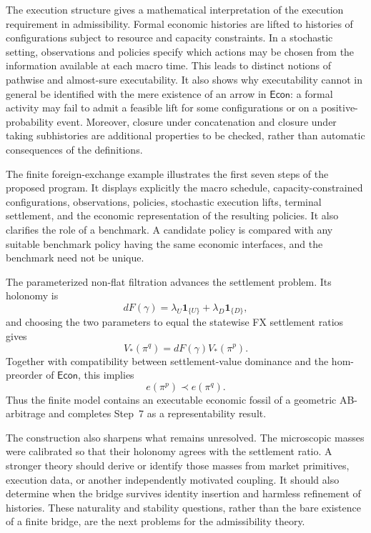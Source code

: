 \documentclass[11pt,a4paper]{article}
\newcommand{\Econ}{\mathsf{Econ}}
\begin{document}
The execution structure gives a mathematical interpretation of the
execution requirement in admissibility.  Formal economic histories are
lifted to histories of configurations subject to resource and capacity
constraints.  In a stochastic setting, observations and policies specify
which actions may be chosen from the information available at each macro
time.  This leads to distinct notions of pathwise and almost-sure
executability.  It also shows why executability cannot in general be
identified with the mere existence of an arrow in \(\Econ\): a formal
activity may fail to admit a feasible lift for some configurations or on
a positive-probability event.  Moreover, closure under concatenation and
closure under taking subhistories are additional properties to be checked,
rather than automatic consequences of the definitions.

The finite foreign-exchange example illustrates the first seven steps of
the proposed program.  It displays explicitly the macro schedule,
capacity-constrained configurations, observations, policies, stochastic
execution lifts, terminal settlement, and the economic representation of
the resulting policies.  It also clarifies the role of a benchmark.  
A candidate policy is compared with any suitable benchmark policy having
the same economic interfaces, and the benchmark need not be unique.

The parameterized non-flat filtration advances the settlement problem.
Its holonomy is
\[
  dF(\gamma)
  =\lambda_U\mathbf1_{\{U\}}
   +\lambda_D\mathbf1_{\{D\}},
\]
and choosing the two parameters to equal the statewise FX settlement ratios
gives
\[
  V_*(\pi^q)=dF(\gamma)V_*(\pi^p).
\]
Together with compatibility between settlement-value dominance and the
hom-preorder of \(\Econ\), this implies
\[
  e(\pi^p)\prec e(\pi^q).
\]
Thus the finite model contains an executable economic fossil of a geometric
AB-arbitrage and completes Step~7 as a representability result.

The construction also sharpens what remains unresolved.  The microscopic
masses were calibrated so that their holonomy agrees with the settlement
ratio.  A stronger theory should derive or identify those masses from
market primitives, execution data, or another independently motivated
coupling.  It should also determine when the bridge survives identity
insertion and harmless refinement of histories.  These naturality and
stability questions, rather than the bare existence of a finite bridge,
are the next problems for the admissibility theory.
\end{document}
